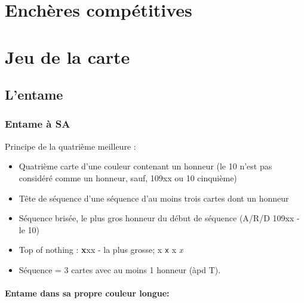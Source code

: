 \documentclass[a4paper]{article}
\begin{document}
\section{Enchères compétitives}

\section{Jeu de la carte}

\subsection{L'entame}

\subsubsection{Entame à SA}

Principe de la quatrième meilleure :

\begin{itemize}
\item Quatrième carte d'une couleur contenant un honneur (le 10 n'est pas considéré comme un honneur, sauf, 109xx ou 10 cinquième)

\end{itemize}

\begin{itemize}
\item Tête de séquence d'une séquence d'au moins trois cartes dont un honneur

\end{itemize}

\begin{itemize}
\item Séquence brisée, le plus gros honneur du début de séquence (A/R/D 109xx - le 10)

\end{itemize}

\begin{itemize}
\item Top of nothing : \textbf{x}xx - la plus grosse; x \texttt{x} x \emph{x}

\end{itemize}

\begin{itemize}
\item Séquence = 3 cartes avec au moins 1 honneur (àpd T).

\end{itemize}

\paragraph{Entame dans sa propre couleur longue:}
\end{document}
